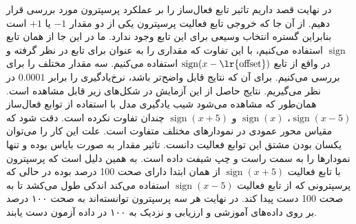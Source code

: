 \documentclass[12pt, a4paper]{article}
\DeclareMathOperator{\sign}{sign}
\begin{document}
در نهایت قصد داریم تاثیر تابع فعال‌ساز را بر عملکرد پرسپترون مورد بررسی قرار دهیم.
از آن جا که خروجی تابع فعالیت پرسپترون یکی از دو مقدار $-1$ یا $+1$ است بنابراین
گستره انتخاب وسیعی برای این تابع وجود ندارد. ما در این جا از همان تابع $\sign$ استفاده می‌کنیم،
با این تفاوت که مقداری را به عنوان  برای تابع در نظر گرفته و در واقع از تابع $\sign(x-\text{\lr{offset}})$
استفاده می‌کنیم. سه مقدار مختلف را برای  بررسی می‌کنیم. برای آن که نتایج قابل
واضح‌تر باشد، نرخ‌یادگیری را برابر $0.0001$ در نظر می‌گیریم. نتایج حاصل از این آزمایش در شکل‌های زیر قابل مشاهده
است. همان‌طور که مشاهده می‌شود شیب یادگیری مدل با استفاده از توابع فعال‌ساز $\sign(x-5)$، $\sign(x)$ و $\sign(x+5)$
چندان تفاوت نکرده است. دقت شود که مقیاس محور عمودی در نمودار‌های مختلف متفاوت است. علت این کار را می‌توان یکسان
بودن مشتق این توابع فعالیت دانست. تاثیر مقدار  به صورت بایاس بوده و تنها نمودار‌ها را به سمت
راست و چپ شیفت داده است. به همین دلیل است که پرسپترون با تابع فعالیت $\sign(x+5)$ از همان ابتدا دارای صحت
100 درصد بوده در حالی که پرسپترونی که از تابع فعالیت $\sign(x-5)$ استفاده می‌کند اندکی طول می‌کشد تا به صحت 100
دست پیدا کند. در نهایت هر سه پرسپترون توانسته‌اند به صحت ۱۰۰ درصد بر روی داده‌های آموزشی و
ارزیابی و نزدیک به ۱۰۰ در داده آزمون دست یابند.
\end{document}
